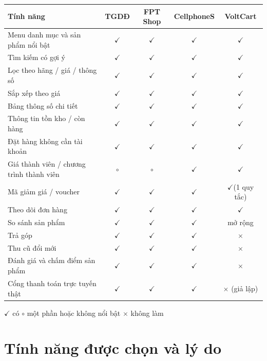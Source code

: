 \documentclass[12pt,a4paper]{article}   %
\newcommand{\yes}{$\checkmark$}
\newcommand{\no}{$\times$}
\newcommand{\half}{$\circ$}
\newcommand{\ProjectName}{VoltCart}
\begin{document}
\begin{center}
\begin{tabularx}{\linewidth}{|Y|c|c|c|c|}
\hline
{} \textbf{Tính năng} & \textbf{TGDĐ} & \textbf{FPT Shop} & \textbf{CellphoneS} & \textbf{\ProjectName} \\ \hline \endhead
Menu danh mục và sản phẩm nổi bật          & \yes & \yes & \yes & \yes \\ \hline
Tìm kiếm có gợi ý                          & \yes & \yes & \yes & \yes \\ \hline
Lọc theo hãng / giá / thông số             & \yes & \yes & \yes & \yes \\ \hline
Sắp xếp theo giá                           & \yes & \yes & \yes & \yes \\ \hline
Bảng thông số chi tiết                     & \yes & \yes & \yes & \yes \\ \hline
Thông tin tồn kho / còn hàng               & \yes & \yes & \yes & \yes \\ \hline
Đặt hàng không cần tài khoản               & \yes & \yes & \yes & \yes \\ \hline
Giá thành viên / chương trình thành viên   & \half & \half & \yes & \yes \\ \hline
Mã giảm giá / voucher                      & \yes & \yes & \yes & \yes (1 quy tắc) \\ \hline
Theo dõi đơn hàng                          & \yes & \yes & \yes & \yes \\ \hline
So sánh sản phẩm                           & \yes & \yes & \yes & mở rộng \\ \hline
Trả góp                                    & \yes & \yes & \yes & \no \\ \hline
Thu cũ đổi mới                             & \yes & \yes & \yes & \no \\ \hline
Đánh giá và chấm điểm sản phẩm             & \yes & \yes & \yes & \no \\ \hline
Cổng thanh toán trực tuyến thật            & \yes & \yes & \yes & \no{} (giả lập) \\ \hline
\end{tabularx}

{\small \yes{} có \quad \half{} một phần hoặc không nổi bật \quad \no{} không làm}
\end{center}

\section{Tính năng được chọn và lý do}
\end{document}
